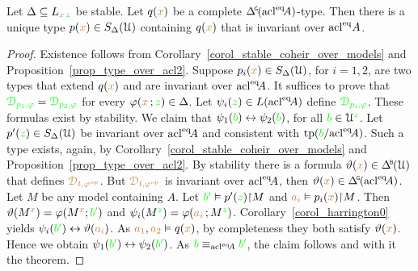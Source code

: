 \begin{theorem}[ (Stationarity)]\label{thm_stationarity}
  Let $\Delta\subseteq L_{{\color{brown} x}\,{\color{green} z}}$ be stable.
  Let $q({\color{brown} x})$ be a complete $\GDelta(\acl^\eq\!A)$-type.
  Then there is a unique type $p({\color{brown} x})\in S_\Delta(\EuScript U)$ containing $q({\color{brown} x})$ that is invariant over ${\rm acl}^{{\rm eq}} A$.
\end{theorem}

\begin{proof}
  Existence follows from Corollary~\ref{corol_stable_coheir_over_models} and Proposition~\ref{prop_type_over_acl2}.
  Suppose $p_i({\color{brown} x})\in S_\Delta(\EuScript U)$, for $i=1,2$, are two types that extend $q({\color{brown} x})$ and are invariant over ${\rm acl}^{{\rm eq}}\!A$.
  It suffices to prove that ${\color{green}\EuScript D_{p_1,\varphi}}={\color{green}\EuScript D_{p_2,\varphi}}$ for every $\varphi({\color{brown} x}\,;{\color{green} z})\in\Delta$.
  Let $\psi_i({\color{green} z})\in L({\rm acl}^{{\rm eq}}\!A)$ define ${\color{green}\EuScript D_{p_i,\varphi}}$.
  These formulas exist by stability.
  We claim that $\psi_1({\color{green} b})\leftrightarrow\psi_2({\color{green} b})$, for all ${\color{green} b}\in\EuScript U^{\color{green} z}$.
  Let $p'({\color{green} z})\in S_\Delta(\EuScript U)$ be invariant over ${\rm acl}^{{\rm eq}}\!A$ and consistent with ${\rm tp}({\color{green} b}/{\rm acl}^{{\rm eq}}\!A)$.
  Such a type exists, again, by Corollary~\ref{corol_stable_coheir_over_models} and Proposition~\ref{prop_type_over_acl2}.
  By stability there is a formula $\theta({\mr x})\in\BDelta(\U)$ that defines ${\color{brown}\EuScript D_{t,\varphi^{\rm op}}}$.
  But ${\color{brown}\EuScript D_{t,\varphi^{\rm op}}}$ is invariant over ${\rm acl}^{{\rm eq}}\!A$, then $\theta({\mr x})\in\GDelta(\acl^\eq\!A)$.
  Let $M$ be any model containing $A$.
  Let ${\color{green} b'}\vDash p'({\color{green} z}){\restriction}M$ and ${\color{brown} a_i}\vDash p_i({\color{brown} x}){\restriction}M$.
  Then $\vartheta(M^{\color{brown} x})=\varphi(M^{\color{brown} x};{\color{green} b'})$ and $\psi_i(M^{\color{green} z})=\varphi({\color{brown} a_i}\,;M^{\color{green} z})$.
  Corollary~\ref{corol_harrington0} yields $\psi_i({\color{green} b'})\leftrightarrow\vartheta({\color{brown} a_i})$.
  As ${\color{brown} a_1},{\color{brown} a_2}\vDash q({\color{brown} x})$, by completeness they both satisfy $\vartheta({\color{brown} x})$. 
  Hence we obtain $\psi_1({\color{green} b'})\leftrightarrow\psi_2({\color{green} b'})$.
  As ${\color{green} b}\equiv_{{\rm acl}^{{\rm eq}}\!A}{\color{green} b'}$, the claim follows and with it the theorem.
\end{proof}


